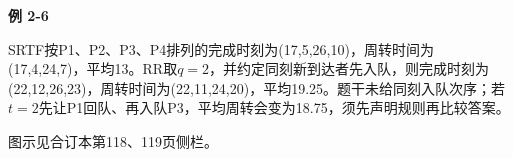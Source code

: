 {\color{ink}\bfseries 例 2-6}\par\vspace{1bp}SRTF按P1、P2、P3、P4排列的完成时刻为(17,\allowbreak{}5,\allowbreak{}26,\allowbreak{}10)，周转时间为(17,\allowbreak{}4,\allowbreak{}24,\allowbreak{}7)，平均13。RR取\(q=\allowbreak{}2\)，并约定同刻新到达者先入队，则完成时刻为(22,\allowbreak{}12,\allowbreak{}26,\allowbreak{}23)，周转时间为(22,\allowbreak{}11,\allowbreak{}24,\allowbreak{}20)，平均19.25。题干未给同刻入队次序；若\(t=\allowbreak{}2\)先让P1回队、再入队P3，平均周转会变为18.75，须先声明规则再比较答案。\par {\color{ink}图示见合订本第118、119页侧栏。}
